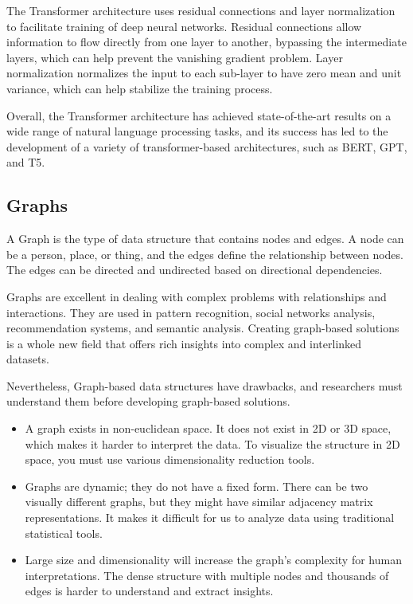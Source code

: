 The Transformer architecture uses residual connections and layer normalization to facilitate training of deep neural networks. Residual connections allow information to flow directly from one layer to another, bypassing the intermediate layers, which can help prevent the vanishing gradient problem. Layer normalization normalizes the input to each sub-layer to have zero mean and unit variance, which can help stabilize the training process.

Overall, the Transformer architecture has achieved state-of-the-art results on a wide range of natural language processing tasks, and its success has led to the development of a variety of transformer-based architectures, such as BERT, GPT, and T5.

\subsection{Graphs}
\label{subsec:3_graphs}


A Graph is the type of data structure that contains nodes and edges. A node can be a person, place, or thing, and the edges define the relationship between nodes. The edges can be directed and undirected based on directional dependencies. 

Graphs are excellent in dealing with complex problems with relationships and interactions. They are used in pattern recognition, social networks analysis, recommendation systems, and semantic analysis. Creating graph-based solutions is a whole new field that offers rich insights into complex and interlinked datasets. 

Nevertheless, Graph-based data structures have drawbacks, and researchers must understand them before developing graph-based solutions.

\begin{itemize}
	\item A graph exists in non-euclidean space. It does not exist in 2D or 3D space, which makes it harder to interpret the data. To visualize the structure in 2D space, you must use various dimensionality reduction tools.
	\item Graphs are dynamic; they do not have a fixed form. There can be two visually different graphs, but they might have similar adjacency matrix representations. It makes it difficult for us to analyze data using traditional statistical tools.
	\item Large size and dimensionality will increase the graph's complexity for human interpretations. The dense structure with multiple nodes and thousands of edges is harder to understand and extract insights. 
\end{itemize}

